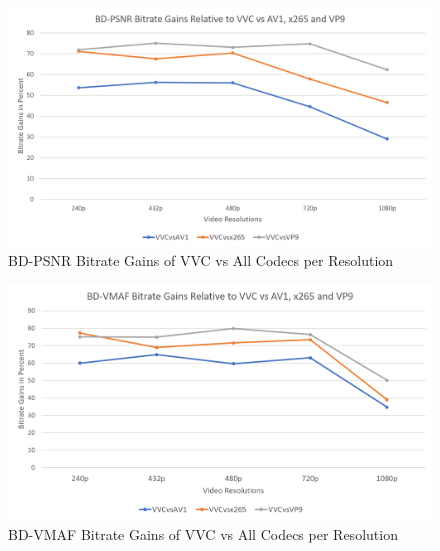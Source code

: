 \documentclass{book}
\begin{document}
\begin{figure}[hbt!]
	\centering
	\includegraphics[width=1.0\linewidth]{pictures/ch7/BD-PSNR-BitrateGains_VVCvsAll.png}
	\caption{BD-PSNR Bitrate Gains of VVC vs All Codecs per Resolution}
	\label{fig:VVC-vs-All-PSNR}
\end{figure}

\begin{figure}[hbt!]
	\centering
	\includegraphics[width=1.0\linewidth]{pictures/ch7/BD-VMAF-BitrateGains_VVCvsAll.png}
	\caption{BD-VMAF Bitrate Gains of VVC vs All Codecs per Resolution}
	\label{fig:VVC-vs-All-VMAF}
\end{figure}
\end{document}
